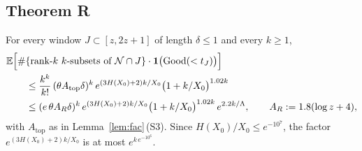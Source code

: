 \subsection{Theorem R}\label{sec:A-R}

\begin{theorem}\label{thm:R}
For every window $J\subset[z,2z+1]$ of length $\delta\le1$ and every $k\ge1$,
\[
\begin{aligned}
  &\mathbb{E}\Bigl[\#\{\text{rank-}k\ k\text{-subsets of }\mathcal{N}\cap J\}\cdot\mathbf 1\bigl(\mathrm{Good}(<t_J)\bigr)\Bigr]\\
  &\qquad\le\frac{k^k}{k!}\,(\theta A_{\mathrm{top}}\delta)^k\,e^{(3H(X_0)+2)k/X_0}\bigl(1+k/X_0\bigr)^{1.02k}\\
  &\qquad\le(e\,\theta A_R\delta)^k\,e^{(3H(X_0)+2)k/X_0}\bigl(1+k/X_0\bigr)^{1.02k}\,e^{2.2k/\Lambda},
  \qquad A_R:=1.8(\log z+4),
\end{aligned}
\]
with $A_{\mathrm{top}}$ as in Lemma~\ref{lem:fac}\,(S3). Since $H(X_0)/X_0\le e^{-10^{7}}$, the factor
$e^{(3H(X_0)+2)k/X_0}$ is at most $e^{k\,e^{-10^{6}}}$.
\end{theorem}

